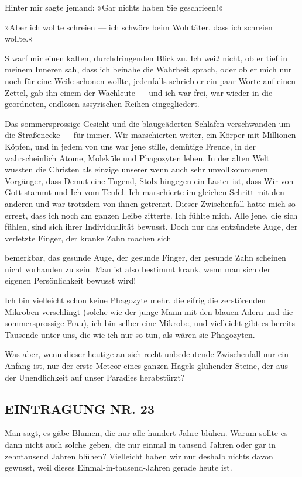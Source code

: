 Hinter mir sagte jemand: »Gar nichts haben Sie geschrieen!«

»Aber ich wollte schreien — ich schwöre beim Wohltäter, dass ich
schreien wollte.«

S warf mir einen kalten, durchdringenden Blick zu. Ich weiß nicht,
ob er tief in meinem Inneren sah, dass ich beinahe die Wahrheit
sprach, oder ob er mich nur noch für eine Weile schonen wollte,
jedenfalls schrieb er ein paar Worte auf einen Zettel, gab ihn
einem der Wachleute — und ich war frei, war wieder in die
geordneten, endlosen assyrischen Reihen eingegliedert.

Das sommersprossige Gesicht und die blaugeäderten Schläfen
verschwanden um die Straßenecke — für immer. Wir marschierten
weiter, ein Körper mit Millionen Köpfen, und in jedem von uns war
jene stille, demütige Freude, in der wahrscheinlich Atome, Moleküle
und Phagozyten leben. In der alten Welt wussten die Christen als
einzige unserer wenn auch sehr unvollkommenen Vorgänger, dass Demut
eine Tugend, Stolz hingegen ein Laster ist, dass Wir von Gott
stammt und Ich vom Teufel. Ich marschierte im gleichen Schritt mit
den anderen und war trotzdem von ihnen getrennt. Dieser
Zwischenfall hatte mich so erregt, dass ich noch am ganzen Leibe
zitterte. Ich fühlte mich. Alle jene, die sich fühlen, sind sich
ihrer Individualität bewusst. Doch nur das entzündete Auge, der
verletzte Finger, der kranke Zahn machen sich

bemerkbar, das gesunde Auge, der gesunde Finger, der gesunde Zahn
scheinen nicht vorhanden zu sein. Man ist also bestimmt krank, wenn
man sich der eigenen Persönlichkeit bewusst wird!

Ich bin vielleicht schon keine Phagozyte mehr, die eifrig die
zerstörenden Mikroben verschlingt (solche wie der junge Mann mit
den blauen Adern und die sommersprossige Frau), ich bin selber eine
Mikrobe, und vielleicht gibt es bereits Tausende unter uns, die wie
ich nur so tun, als wären sie Phagozyten.

Was aber, wenn dieser heutige an sich recht unbedeutende
Zwischenfall nur ein Anfang ist, nur der erste Meteor eines ganzen
Hagels glühender Steine, der aus der Unendlichkeit auf unser
Paradies herabstürzt?

\subsection{EINTRAGUNG NR. 23}

Man sagt, es gäbe Blumen, die nur alle hundert Jahre blühen. Warum
sollte es dann nicht auch solche geben, die nur einmal in tausend
Jahren oder gar in zehntausend Jahren blühen? Vielleicht haben wir
nur deshalb nichts davon gewusst, weil dieses
Einmal-in-tausend-Jahren gerade heute ist.

